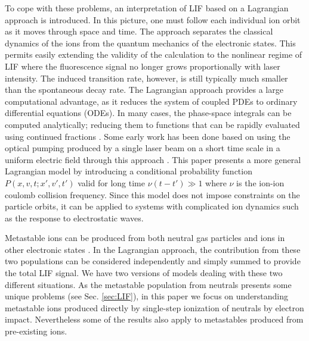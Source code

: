 \documentclass[aip,pop,reprint]{revtex4-1}
\begin{document}


To cope with these problems, an interpretation of LIF based on a Lagrangian approach is introduced. In this picture, one must follow each individual ion orbit as it moves through space and time. The approach separates the classical dynamics of the ions from the quantum mechanics of the electronic states. This permits easily extending the validity of the calculation to the nonlinear regime of LIF where the fluorescence signal no longer grows proportionally with laser intensity. The induced transition rate, however, is still typically much smaller than the spontaneous decay rate. The Lagrangian approach provides a large computational advantage, as it reduces the system of coupled PDEs to ordinary differential equations (ODEs). In many cases, the phase-space integrals can be computed analytically; reducing them to functions that can be rapidly evaluated using continued fractions \cite{mccabe_continued_1984}. Some early work has been done based on using the optical pumping produced by a single laser beam on a short time scale in a uniform electric field through this approach \cite{claire_nonlinear_2001}. This paper presents a more general Lagrangian model by introducing a conditional probability function $P(x,v,t;x',v',t')$ valid for long time $\nu(t-t')\gg 1$ where $\nu$ is the ion-ion coulomb collision frequency. Since this model does not impose constraints on the particle orbits, it can be applied to systems with complicated ion dynamics such as the response to electrostatic waves.

Metastable ions can be produced from both neutral gas particles \cite{cherrington_gaseous_1979} and ions in other electronic states \cite{goeckner_laserinduced_1991}. In the Lagrangian approach, the contribution from these two populations can be considered independently and simply summed to provide the total LIF signal. We have two versions of models dealing with these two different situations. As the metastable population from neutrals presents some unique problems (see Sec. \ref{sec:LIF}), in this paper we focus on understanding metastable ions produced directly by single-step ionization of neutrals by electron impact. Nevertheless some of the results also apply to metastables produced from pre-existing ions.
\end{document}

